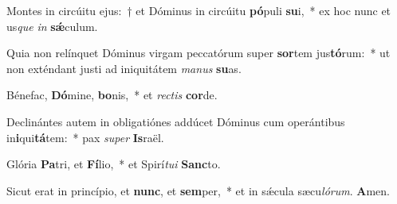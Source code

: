 Montes in circúitu ejus:~† et Dóminus in circúitu \textbf{pó}puli \textbf{su}i,~* ex hoc nunc et us\textit{que} \textit{in} \textbf{sǽ}culum.

Quia non relínquet Dóminus virgam peccatórum super \textbf{sor}tem jus\textbf{tó}rum:~* ut non exténdant justi ad iniquitátem \textit{ma}\textit{nus} \textbf{su}as.

Bénefac, \textbf{Dó}mine, \textbf{bo}nis,~* et \textit{rec}\textit{tis} \textbf{cor}de.

Declinántes autem in obligatiónes addúcet Dóminus cum operántibus in\textbf{i}qui\textbf{tá}tem:~* pax \textit{su}\textit{per} \textbf{Is}raël.

Glória \textbf{Pa}tri, et \textbf{Fí}lio,~* et Spirí\textit{tu}\textit{i} \textbf{Sanc}to.

Sicut erat in princípio, et \textbf{nunc}, et \textbf{sem}per,~* et in sǽcula sæcu\textit{ló}\textit{rum}. \textbf{A}men.

